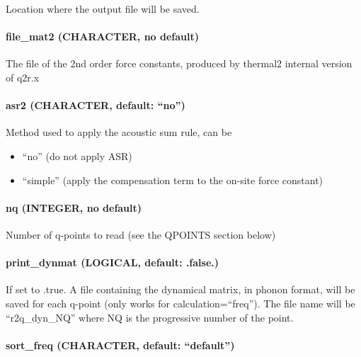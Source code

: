 \documentclass[
]{article}
\providecommand{\tightlist}{%
  \setlength{\itemsep}{0pt}\setlength{\parskip}{0pt}}
\begin{document}
Location where the output file will be saved.

\hypertarget{file_mat2-character-no-default}{%
\paragraph{file\_mat2 (CHARACTER, no
default)}\label{file_mat2-character-no-default}}

The file of the 2nd order force constants, produced by thermal2 internal
version of q2r.x

\hypertarget{asr2-character-default-no}{%
\paragraph{\texorpdfstring{asr2 (CHARACTER, default:
\enquote{no})}{asr2 (CHARACTER, default: ``no'')}}\label{asr2-character-default-no}}

Method used to apply the acoustic sum rule, can be

\begin{itemize}
\tightlist
\item
  \enquote{no} (do not apply ASR)
\item
  \enquote{simple} (apply the compensation term to the on-site force
  constant)
\end{itemize}

\hypertarget{nq-integer-no-default}{%
\paragraph{nq (INTEGER, no default)}\label{nq-integer-no-default}}

Number of q-points to read (see the QPOINTS section below)

\hypertarget{print_dynmat-logical-default-.false.}{%
\paragraph{print\_dynmat (LOGICAL, default:
.false.)}\label{print_dynmat-logical-default-.false.}}

If set to .true. A file containing the dynamical matrix, in phonon
format, will be saved for each q-point (only works for
calculation=\enquote{freq}). The file name will be
\enquote{r2q\_dyn\_NQ} where NQ is the progressive number of the point.

\hypertarget{sort_freq-character-default-default}{%
\paragraph{\texorpdfstring{sort\_freq (CHARACTER, default:
\enquote{default})}{sort\_freq (CHARACTER, default: ``default'')}}\label{sort_freq-character-default-default}}
\end{document}
